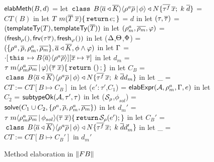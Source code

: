 \begin{figure}

\begin{codeml}
$\elabMeth(B,d)$ = 
  let $\headerOf{B}\{\bar{\tau^f}\,\xbar;\;k\;\bar{d}\}$ = $CT(B)$ in
  let $T \; m(\tbar \; \xbar)\{\C{return} e;\}$ = $d$ in
  let $(\tau,\taubar)$ = $(\templateTy(T),\templateTy(\tbar))$ in
  let $(\rhoalloc_m,\rhobarm,\varphi)$ = $(\fresh_\rho(),\frv(\tau\taubar),\fresh_\varphi())$ in
  let ($\rhoenv$,$\aenv$,$\phicx$) = $(\{\rhoalloc,\rhobar,\rhoalloc_m,\rhobarm\},\bar{\tyvar} \extends \bar{\fgjN},\phi \conj \varphi)$ in
  let $\env$ = $\cdot[\thisZ \mapsto B\inang{\bar{\tyvar}}\inang{\rhoalloc\rhobar}][\xbar \mapsto \taubar]$ in
  let $d_m$ = $\tau \; m\inang{\rhoalloc_m\rhobarm \,|\, \varphi} (\taubar \; \xbar)\{\C{return} \unitval;\}$ in
  let $C_B$ = $\headerOf{B}\{\bar{\tau^f}\,\xbar;\;k\;\bar{d}d_m\}$ in
  let _ = $CT := CT[B \mapsto C_B]$ in
  let ($e':\tau'$,$C_1$) = $\elabExpr (\A,\rhoalloc_m,\env,e)$ in
  let $C_2$ = $\subtypeOk({\A},{\tau'},{\tau})$ in
  let ($\substFn_\rho$,$\phi_{sol}$) = $\solve(C_1 \cup C_2,\{\rhoalloc,\rhobar,\rhoallocm,\rhobarm\})$ in
  let $d_m'$ = $\tau \; m\inang{\rhoalloc_m\rhobarm \,|\, \phi_{sol}} (\taubar \; \xbar)\{\C{return} \substFn_\rho(e');\}$ in
  let $C_B'$ = $\headerOf{B}\{\bar{\tau^f}\,\xbar;\;k\;\bar{d}d_m'\}$ in
  let _ = $CT := CT[B \mapsto C_B']$ in
    $d_m'$
\end{codeml}

\caption{Method elaboration in $\absof{\FB}$}
\label{fig:fb-elabmeth}
\end{figure}
